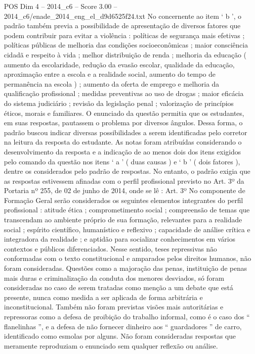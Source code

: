 \begin{textsample}{POS Dim 4 – 2014\_c6 – Score 3.00 – 2014\_c6/enade\_2014\_eng\_el\_d9d6525f24.txt}
No concernente ao item ‘ b ’, o padrão também previa a possibilidade de apresentação de diversos fatores que podem contribuir para evitar a violência : políticas de segurança mais efetivas ; políticas públicas de melhoria das condições socioeconômicas ; maior consciência cidadã e respeito à vida ; melhor distribuição de renda ; melhoria da educação ( aumento da escolaridade, redução da evasão escolar, qualidade da educação, aproximação entre a escola e a realidade social, aumento do tempo de permanência na escola ) ; aumento da oferta de emprego e melhoria da qualificação profissional ; medidas preventivas ao uso de drogas ; maior eficácia do sistema judiciário ; revisão da legislação penal ; valorização de princípios éticos, morais e familiares.
O enunciado da questão permitia que os estudantes, em suas respostas, pautassem o problema por diversos ângulos.
Dessa forma, o padrão buscou indicar diversas possibilidades a serem identificadas pelo corretor na leitura da resposta do estudante.
As notas foram atribuídas considerando o desenvolvimento da resposta e a indicação de ao menos dois dos itens exigidos pelo comando da questão nos itens ‘ a ’ ( duas causas ) e ‘ b ’ ( dois fatores ), dentre os considerados pelo padrão de respostas.
No entanto, o padrão exigia que as respostas estivessem afinadas com o perfil profissional previsto no Art. 3º da Portaria nº 255, de 02 de junho de 2014, onde se lê : Art. 3º No componente de Formação Geral serão considerados os seguintes elementos integrantes do perfil profissional : atitude ética ; comprometimento social ; compreensão de temas que transcendam ao ambiente próprio de sua formação, relevantes para a realidade social ; espírito científico, humanístico e reflexivo ; capacidade de análise crítica e integradora da realidade ; e aptidão para socializar conhecimentos em vários contextos e públicos diferenciados.
Nesse sentido, teses repressivas não conformadas com o texto constitucional e amparados pelos direitos humanos, não foram consideradas.
Questões como a majoração das penas, instituição de penas mais duras e criminalização da conduta dos menores desviados, só foram consideradas no caso de serem tratadas como menção a um debate que está presente, nunca como medida a ser aplicada de forma arbitrária e inconstitucional.
Também não foram previstas visões mais autoritárias e repressoras como a defesa de proibição do trabalho informal, como é o caso dos “ flanelinhas ”, e a defesa de não fornecer dinheiro aos “ guardadores ” de carro, identificado como esmolas por alguns.
Não foram consideradas respostas que meramente reproduziam o enunciado sem qualquer reflexão ou análise.

\end{textsample}
